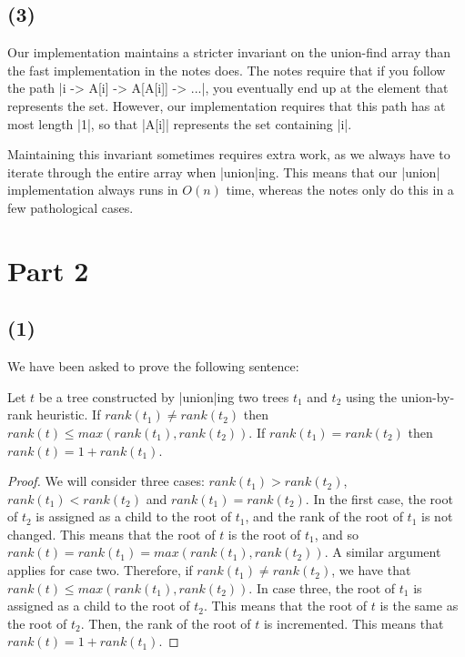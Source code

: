 \documentclass[a4paper]{article}
\begin{document}
\subsection*{(3)}

Our implementation maintains a stricter invariant on the union-find array than the fast implementation in the notes does. The notes require that if you follow the path \code|i -> A[i] -> A[A[i]] -> ...|, you eventually end up at the element that represents the set. However, our implementation requires that this path has at most length \code|1|, so that \code|A[i]| represents the set containing \code|i|.

Maintaining this invariant sometimes requires extra work, as we always have to iterate through the entire array when \code|union|ing. This means that our \code|union| implementation always runs in \(O(n)\) time, whereas the notes only do this in a few pathological cases.

\section*{Part 2}

\subsection*{(1)}

We have been asked to prove the following sentence:

\begin{theorem} \label{union-rank} Let \(t\) be a tree constructed by \code|union|ing two trees \(t_1\) and \(t_2\) using the union-by-rank heuristic. If \(rank(t_1) \ne rank(t_2)\) then \(rank(t) \le max(rank(t_1), rank(t_2))\). If \(rank(t_1) = rank(t_2)\) then \(rank(t) = 1 + rank(t_1)\).\end{theorem}

\begin{proof} We will consider three cases: \(rank(t_1) > rank(t_2)\), \(rank(t_1) < rank(t_2)\) and \(rank(t_1) = rank(t_2)\). In the first case, the root of \(t_2\) is assigned as a child to the root of \(t_1\), and the rank of the root of \(t_1\) is not changed. This means that the root of \(t\) is the root of \(t_1\), and so \(rank(t) = rank(t_1) = max(rank(t_1), rank(t_2))\). A similar argument applies for case two. Therefore, if \(rank(t_1) \ne rank(t_2)\), we have that \(rank(t) \le max(rank(t_1), rank(t_2))\). In case three, the root of \(t_1\) is assigned as a child to the root of \(t_2\). This means that the root of \(t\) is the same as the root of \(t_2\). Then, the rank of the root of \(t\) is incremented. This means that \(rank(t) = 1+rank(t_1)\).\end{proof}
\end{document}

